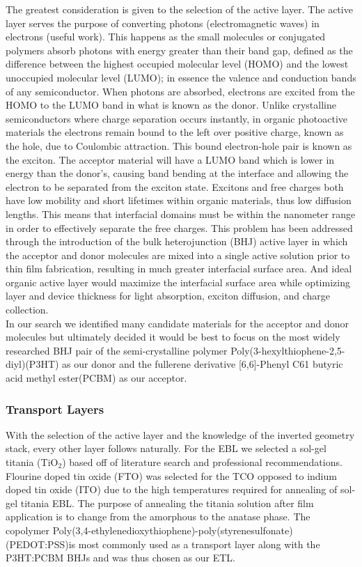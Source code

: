 	The greatest consideration is given to the selection of the active layer. The active layer serves the purpose of converting photons (electromagnetic waves) in electrons (useful work). This happens as the small molecules or conjugated polymers absorb photons with energy greater than their band gap, defined as the difference between the highest occupied molecular level (HOMO) and the lowest unoccupied molecular level (LUMO); in essence the valence and conduction bands of any semiconductor. When photons are absorbed, electrons are excited from the HOMO to the LUMO band in what is known as the donor. Unlike crystalline semiconductors where charge separation occurs instantly, in organic photoactive materials the electrons remain bound to the left over positive charge, known as the hole, due to Coulombic attraction. This bound electron-hole pair is known as the exciton. The acceptor material will have a LUMO band which is lower in energy than the donor's, causing band bending at the interface and allowing the electron to be separated from the exciton state. Excitons and free charges both have low mobility and short lifetimes within organic materials, thus low diffusion lengths. This means that interfacial domains must be within the nanometer range in order to effectively separate the free charges. This problem has been addressed through the introduction of the bulk heterojunction (BHJ) active layer in which the acceptor and donor molecules are mixed into a single active solution prior to thin film fabrication, resulting in much greater interfacial surface area. And ideal organic active layer would maximize the interfacial surface area while optimizing layer and device thickness for light absorption, exciton diffusion, and charge collection.\\
	
	In our search we identified many candidate materials for the acceptor and donor molecules but ultimately decided it would be best to focus on the most widely researched BHJ pair of the semi-crystalline polymer Poly(3-hexylthiophene-2,5-diyl)(P3HT) as our donor and the fullerene derivative [6,6]-Phenyl C61 butyric acid methyl ester(PCBM) as our acceptor.\\
	
\subsubsection{Transport Layers}
	
	With the selection of the active layer and the knowledge of the inverted geometry stack, every other layer follows naturally. For the EBL we selected a sol-gel titania (TiO$_2$) based off of literature search and professional recommendations. Flourine doped tin oxide (FTO) was selected for the TCO opposed to indium doped tin oxide (ITO) due to the high temperatures required for annealing of sol-gel titania EBL. The purpose of annealing the titania solution after film application is to change from the amorphous to the anatase phase. The copolymer Poly(3,4-ethylenedioxythiophene)-poly(styrenesulfonate) (PEDOT:PSS)is most commonly used as a transport layer along with the P3HT:PCBM BHJs and was thus chosen as our ETL.
	
